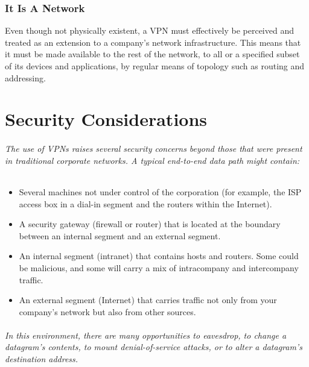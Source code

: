 \documentclass[10pt,a4paper]{article}
\begin{document}
\section{It Is A Network}

Even though not physically existent, a VPN must effectively be perceived and
treated as an extension to a company’s network infrastructure. This means
that it must be made available to the rest of the network, to all or a specified 
subset of its devices and applications, by regular means of topology such as routing and addressing.


\newpage
\part{Security Considerations}
\paragraph*{The use of VPNs raises several security concerns beyond those that were
present in traditional corporate networks. A typical end-to-end data path might
contain:}


\begin{itemize}
\item Several machines not under control of the corporation (for example, the ISP
access box in a dial-in segment and the routers within the Internet).
\item A security gateway (firewall or router) that is located at the boundary between
an internal segment and an external segment.
\item An internal segment (intranet) that contains hosts and routers. Some could be
malicious, and some will carry a mix of intracompany and intercompany traffic.
\item An external segment (Internet) that carries traffic not only from your
company's network but also from other sources.
\end{itemize}

\paragraph*{In this environment, there are many opportunities to eavesdrop,
to change a datagram's contents, to mount denial-of-service attacks, or to alter a
datagram's destination address.}
\end{document}
